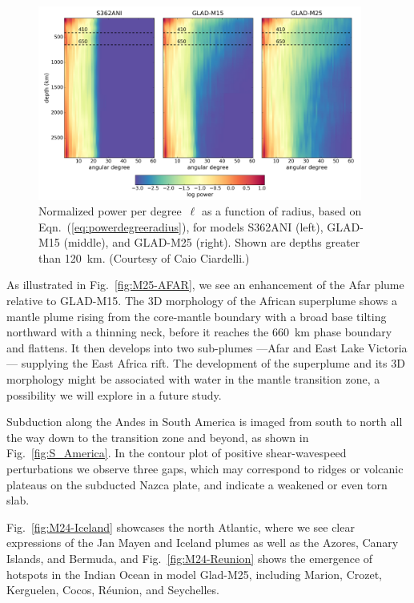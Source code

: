 \documentclass[extra,mreferee]{gji}
\begin{document}
\begin{figure}
  \centering
  \includegraphics[width=0.95\textwidth]{figures/power_radius.pdf}
  \caption{\small{Normalized power per degree~$\ell$ as a function of radius, based on Eqn.~(\ref{eq:powerdegreeradius}), for models S362ANI (left), GLAD-M15 (middle), and GLAD-M25 (right).
  Shown are depths greater than 120~km.
  (Courtesy of Caio Ciardelli.)
  }}
  \label{fig:powerspectraradius}
\end{figure}

As illustrated in Fig.~\ref{fig:M25-AFAR},
we see an enhancement of the Afar plume relative to GLAD-M15.
The 3D morphology of the African superplume shows a mantle plume rising from the core-mantle boundary with a broad base tilting northward with a thinning neck, before it reaches the 660~km phase boundary and flattens.
It then develops into two sub-plumes ---Afar and East Lake Victoria--- supplying the East Africa rift.
The development of the superplume and its 3D morphology might be associated with water in the mantle transition zone, a possibility we will explore in a future study.

Subduction along the Andes in South America is imaged from south to north all the way down to the transition zone and beyond, as shown in Fig.~\ref{fig:S_America}.
In the contour plot of positive shear-wavespeed perturbations we observe three gaps, which may correspond to ridges or volcanic plateaus on the subducted Nazca plate, and indicate a weakened or even torn slab.

Fig.~\ref{fig:M24-Iceland} showcases the north Atlantic, where we see clear expressions of the Jan Mayen and Iceland plumes as well as the Azores, Canary Islands, and Bermuda,
and Fig.~\ref{fig:M24-Reunion} shows the emergence of hotspots in the Indian Ocean in model Glad-M25,
including Marion, Crozet, Kerguelen, Cocos, R\'eunion, and Seychelles.
\end{document}
